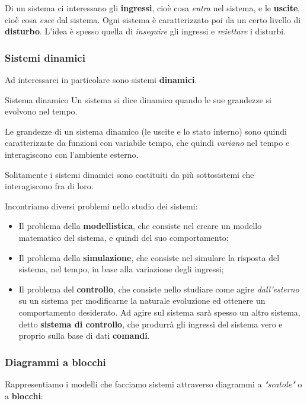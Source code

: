 \documentclass[a4paper,11pt]{article}
\begin{document}
Di un sistema ci interessano gli \textbf{ingressi}, cioè cosa \textit{entra} nel sistema, e le \textbf{uscite}, cioè cosa \textit{esce} dal sistema.
Ogni sistema è caratterizzato poi da un certo livello di \textbf{disturbo}.
L'idea è spesso quella di \textit{inseguire} gli ingressi e \textit{reiettare} i disturbi.

\subsubsection{Sistemi dinamici}
Ad interessarci in particolare sono  sistemi \textbf{dinamici}.
\begin{definition}{Sistema dinamico}
	Un sistema si dice dinamico quando le sue grandezze si evolvono nel tempo.
\end{definition}

Le grandezze di un sistema dinamico (le uscite e lo stato interno) sono quindi caratterizzate da funzioni con variabile tempo, che quindi \textit{variano} nel tempo e interagiscono con l'ambiente esterno.

Solitamente i sistemi dinamici sono costituiti da più sottosistemi che interagiscono fra di loro.

\par\medskip

Incontriamo diversi problemi nello studio dei sistemi:
\begin{itemize}
	\item Il problema della \textbf{modellistica}, che consiste nel creare un modello matematico del sistema, e quindi del suo comportamento;
	\item Il problema della \textbf{simulazione}, che consiste nel simulare la risposta del sistema, nel tempo, in base alla variazione degli ingressi;
	\item Il problema del \textbf{controllo}, che consiste nello studiare come agire \textit{dall'esterno} su un sistema per modificarne la naturale evoluzione ed ottenere un comportamento desiderato.
		Ad agire sul sistema sarà spesso un altro sistema, detto \textbf{sistema di controllo}, che produrrà gli ingressi del sistema vero e proprio sulla base di dati \textbf{comandi}.
\end{itemize}

\subsubsection{Diagrammi a blocchi}
Rappresentiamo i modelli che facciamo sistemi attraverso diagrammi a \textit{"scatole"} o a \textbf{blocchi}:
\end{document}

